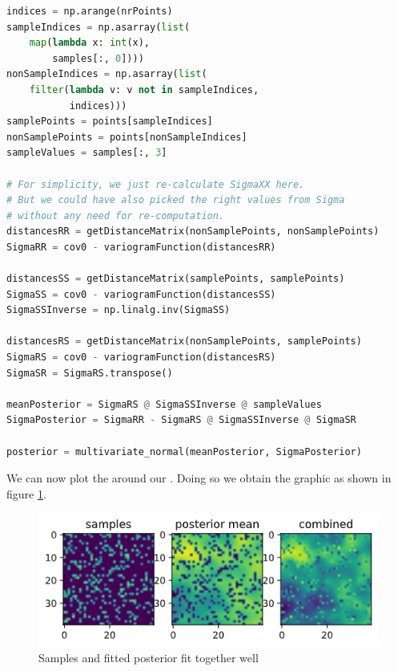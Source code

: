 \begin{lstlisting}[language=python]
indices = np.arange(nrPoints)
sampleIndices = np.asarray(list(
    map(lambda x: int(x),
        samples[:, 0])))
nonSampleIndices = np.asarray(list(
    filter(lambda v: v not in sampleIndices,
           indices)))
samplePoints = points[sampleIndices]
nonSamplePoints = points[nonSampleIndices]
sampleValues = samples[:, 3]

# For simplicity, we just re-calculate SigmaXX here.
# But we could have also picked the right values from Sigma
# without any need for re-computation.
distancesRR = getDistanceMatrix(nonSamplePoints, nonSamplePoints)
SigmaRR = cov0 - variogramFunction(distancesRR)

distancesSS = getDistanceMatrix(samplePoints, samplePoints)
SigmaSS = cov0 - variogramFunction(distancesSS)
SigmaSSInverse = np.linalg.inv(SigmaSS)

distancesRS = getDistanceMatrix(nonSamplePoints, samplePoints)
SigmaRS = cov0 - variogramFunction(distancesRS)
SigmaSR = SigmaRS.transpose()

meanPosterior = SigmaRS @ SigmaSSInverse @ sampleValues
SigmaPosterior = SigmaRR - SigmaRS @ SigmaSSInverse @ SigmaSR

posterior = multivariate_normal(meanPosterior, SigmaPosterior)   
\end{lstlisting}

We can now plot the  around our . Doing so we obtain the graphic as shown in figure \ref{gpPosterior}.

\begin{figure}[H]
  \centering
  \includegraphics[width=0.7\linewidth]{images/gp_posterior_samples.png}
  \caption{Samples and fitted posterior fit together well}
  \label{gpPosterior}
\end{figure}


